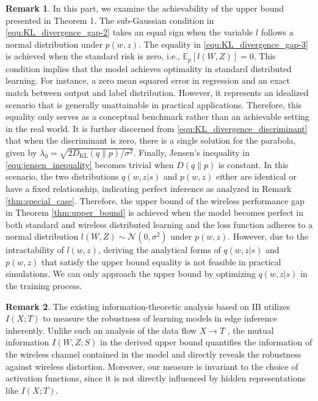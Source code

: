 \documentclass[lettersize,journal]{IEEEtran}
\newcommand{\E}{\mathbb{E}}
\theoremstyle{definition}
\newtheorem{remark}{Remark}
\theoremstyle{plain}
\begin{document}
\begin{remark}
    In this part, we examine the achievability of the upper bound presented in Theorem 1. The sub-Gaussian condition in \cref{equ:KL_divergence_gap-2} takes an equal sign when the variable $l$ follows a normal distribution under $p(w,z)$. 
    The equality in \cref{equ:KL_divergence_gap-3} is achieved when the standard risk is zero, i.e., $\E_p[l(W, Z)]=0$. This condition implies that the model achieves optimality in standard distributed learning. For instance, a zero mean squared error in regression and an exact match between output and label distribution.
    However, it represents an idealized scenario that is generally unattainable in practical applications. Therefore, this equality only serves as a conceptual benchmark rather than an achievable setting in the real world.
    It is further discerned from \cref{equ:KL_divergence_discriminant} that when the discriminant is zero, there is a single solution for the parabola, given by $\lambda_0=\sqrt{2D_{\text{KL}}(q\|p)/\sigma^2}$. 
    Finally, Jensen's inequality in \cref{equ:jensen_inequality} becomes trivial when $D(q\|p)$ is constant. In this scenario, the two distributions $q(w,z|s)$ and $p(w,z)$ either are identical or have a fixed relationship, indicating perfect inference as analyzed in Remark \ref{thm:special_case}.
    Therefore, the upper bound of the wireless performance gap in Theorem \ref{thm:upper_bound} is achieved when the model becomes perfect in both standard and wireless distributed learning and the loss function adheres to a normal distribution $l(W,Z)\sim \mathcal{N}(0, \sigma^2)$ under $p(w,z)$. 
    However, due to the intractability of $l(w,z)$, deriving the analytical forms of $q(w,z|s)$ and $p(w,z)$ that satisfy the upper bound equality is not feasible in practical simulations.
    We can only approach the upper bound by optimizing $q(w,z|s)$ in the training process.
\end{remark}

\begin{remark}
    The existing information-theoretic analysis based on IB \cite{IB} utilizes $I(X;T)$ to measure the robustness of learning models in edge inference inherently. Unlike such an analysis of the data flow $X\to T$ \cite{information-flow}, the mutual information $I(W,Z;S)$ in the derived upper bound quantifies the information of the wireless channel contained in the model and directly reveals the robustness against wireless distortion. 
    Moreover, our measure is invariant to the choice of activation functions, since it is not directly influenced by hidden representations like $I(X;T)$.
\end{remark}
\end{document}
